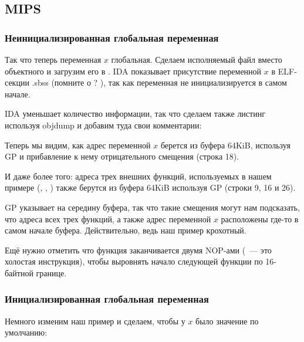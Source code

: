 \subsection{MIPS}

\subsubsection{Неинициализированная глобальная переменная}

Так что теперь переменная $x$ глобальная.
Сделаем исполняемый файл вместо объектного и загрузим его в \IDA.
IDA показывает присутствие переменной $x$ в ELF-секции .sbss (помните о ? ),
так как переменная не инициализируется в самом начале.



IDA уменьшает количество информации, так что сделаем также листинг используя objdump и добавим туда свои комментарии:



Теперь мы видим, как адрес переменной $x$ берется из буфера 64KiB, используя GP и прибавление к нему отрицательного смещения (строка 18).

И даже более того: адреса трех внешних функций, используемых в нашем примере (\puts, \scanf, \printf)
также берутся из буфера 64KiB используя GP (строки 9, 16 и 26).

GP указывает на середину буфера, так что такие смещения могут нам подсказать, что адреса всех трех функций,
а также адрес переменной $x$ расположены где-то в самом начале буфера.
Действительно, ведь наш пример крохотный.

Ещё нужно отметить что функция заканчивается двумя \ac{NOP}-ами (~--- 
это холостая инструкция), чтобы выровнять начало следующей функции по 16-байтной границе.

\subsubsection{Инициализированная глобальная переменная}

Немного изменим наш пример и сделаем, чтобы у $x$ было значение по умолчанию:



